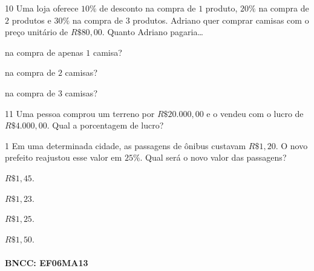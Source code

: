 {

\num{10}  Uma loja oferece $10\%$ de desconto na compra de $1$ produto, $20\%$ na
compra de $2$ produtos e $30\%$ na compra de $3$ produtos. Adriano quer
comprar camisas com o preço unitário de $R\$80,00$. Quanto Adriano
pagaria\ldots{}

\begin{escolha}
\item na compra de apenas $1$ camisa? 
\item na compra de $2$ camisas? 
\item na compra de $3$ camisas? 
\end{escolha}

\num{11}  Uma pessoa comprou um terreno por $R\$20.000,00$ e o vendeu com o
lucro de $R\$4.000,00$. Qual a porcentagem de lucro?



\num{1}  Em uma determinada cidade, as passagens de ônibus custavam $R\$1,20$. O
novo prefeito reajustou esse valor em $25\%$. Qual será o novo valor das
passagens?

\begin{escolha}
\item $R\$1,45$.
\item $R\$1,23$.
\item $R\$1,25$.
\item $R\$1,50$.
\end{escolha}

\paragraph{BNCC: EF06MA13 }


}
